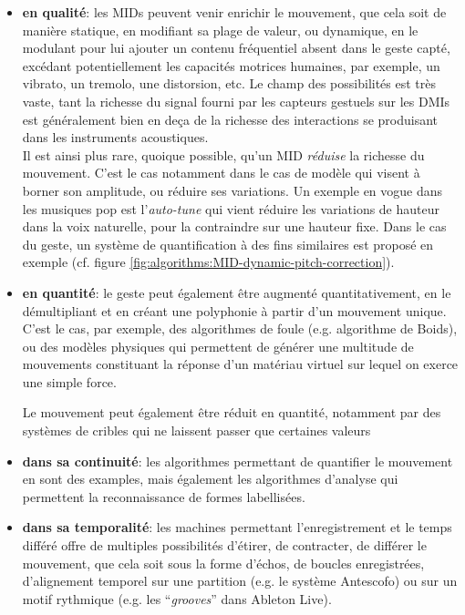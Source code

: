 \begin{itemize}[noitemsep]
	\item \textbf{en qualité}: les MIDs peuvent venir enrichir le mouvement, que cela soit de manière statique, en modifiant sa plage de valeur, ou dynamique, en le modulant pour lui ajouter un contenu fréquentiel absent dans le geste capté, excédant potentiellement les capacités motrices humaines, par exemple, un vibrato, un tremolo, une distorsion, etc. Le champ des possibilités est très vaste, tant la richesse du signal fourni par les capteurs gestuels sur les \glspl{DMI} est généralement bien en deça de la richesse des interactions se produisant dans les instruments acoustiques.\\
	\indent Il est ainsi plus rare, quoique possible, qu'un MID \textit{réduise} la richesse du mouvement. C'est le cas notamment dans le cas de modèle qui visent à borner son amplitude, ou réduire ses variations. Un exemple en vogue dans les musiques pop est l'\textit{auto-tune} qui vient réduire les variations de hauteur dans la voix naturelle, pour la contraindre sur une hauteur fixe. Dans le cas du geste, un système de quantification à des fins similaires est proposé en exemple (cf. figure \ref{fig:algorithms:MID-dynamic-pitch-correction}).

	\item \textbf{en quantité}: le geste peut également être augmenté quantitativement, en le démultipliant et en créant une polyphonie à partir d'un mouvement unique. C'est le cas, par exemple, des algorithmes de foule (e.g. algorithme de Boids), ou des modèles physiques qui permettent de générer une multitude de mouvements constituant la réponse d'un matériau virtuel sur lequel on exerce une simple force.

	Le mouvement peut également être réduit en quantité, notamment par des systèmes de cribles qui ne laissent passer que certaines valeurs
	
	\item \textbf{dans sa continuité}: les algorithmes permettant de quantifier le mouvement en sont des examples, mais également les algorithmes d'analyse qui permettent la reconnaissance de formes labellisées. 
	
	\item \textbf{dans sa temporalité}: les machines permettant l'enregistrement et le temps différé offre de multiples possibilités d'étirer, de contracter, de différer le mouvement, que cela soit sous la forme d'échos, de boucles enregistrées, d'alignement temporel sur une partition (e.g. le système Antescofo) ou sur un motif rythmique (e.g. les ``\textit{grooves}'' dans Ableton Live).


\end{itemize}
